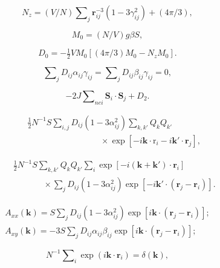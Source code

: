 \documentclass{article}
\begin{document}
\begin{equation} \label{eq:41}
N_z=(V/N)\sum\nolimits_j\boldsymbol{r}_{ij}^{-3}(1-3\gamma_{ij}^2)+(4\pi/3)
,\end{equation}


\begin{equation} \label{eq:42}
M_0=(N/V)g\beta S,
\end{equation}

\begin{equation} \label{eq:43}
D_0=-\tfrac{1}{2}VM_0[(4\pi/3)M_0-N_zM_0].
\end{equation}

\begin{equation} \label{eq:44}
\sum\nolimits_jD_{ij}\alpha_{ij}\gamma_{ij}=\sum\nolimits_jD_{ij}\beta_{ij}\gamma_{ij}=0,
\end{equation}

\begin{equation} \label{eq:45}
-2J\sum\nolimits_{\mathit{nei}}\mathbf{S}_i\cdot\mathbf{S}_j+D_2.
\end{equation}

\begin{eqnarray} \label{eq:46}
&&\tfrac{1}{2}N^{-1}S\sum\nolimits_{i,j}D_{ij}(1-3\alpha_{ij}^2)\sum\nolimits_{k,k'}Q_kQ_{k'}\nonumber\\
&&\phantom{~~~~~~~~~~~~~~~~~~~~~~~~~~~~~~~~~~~~~~~}\times\exp[-i\mathbf{k}\cdot\mathrm{r}_i-i\mathbf{k}'\cdot\mathbf{r}_j],
\end{eqnarray}

\begin{eqnarray} \label{eq:47}
&&\tfrac{1}{2}N^{-1}S\sum\nolimits_{k,k'}Q_kQ_{k'}\sum\nolimits_{i}\exp[-i(\mathbf{k}+\mathbf{k}')\cdot\mathbf{r}_i]\nonumber\\
&&\phantom{~~~~~~~~~~~~~~~~}\times\sum\nolimits_jD_{ij}(1-3\alpha_{ij}^2)\exp[-i\mathbf{k}'\cdot(\mathbf{r}_j-\mathbf{r}_i)].
\end{eqnarray}


\begin{equation} \label{eq:48}
\begin{array}{l}
A_{xx}(\mathbf{k})=S\sum\nolimits_jD_{ij}(1-3\alpha_{ij}^2)\exp[i\mathbf{k}\cdot(\mathbf{r}_j-\mathbf{r}_i)];\\
A_{xy}(\mathbf{k})=-3S\sum\nolimits_jD_{ij}\alpha_{ij}\beta_{ij}\exp[i\mathbf{k}\cdot(\mathbf{r}_j-\mathbf{r}_i)];
\end{array}
\end{equation}

\begin{equation} \label{eq:49}
N^{-1}\sum\nolimits_i\exp(i\mathbf{k}\cdot\mathbf{r}_i)=\delta(\mathbf{k}),
\end{equation}
\end{document}
